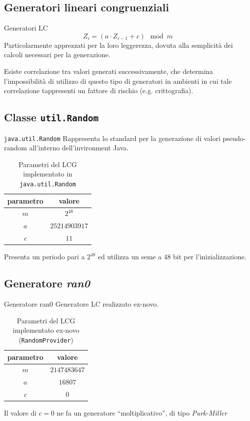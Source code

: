 \documentclass[slidestop,compress,mathserif]{beamer}
\begin{document}
\subsection{Generatori lineari congruenziali}

\begin{frame}{Generatori LC}
\vfill
$$
Z_{i}=(a \cdot Z_{i-1}+c)\mod m
$$
\vfill
Particolarmente apprezzati per la loro leggerezza, dovuta alla semplicit\`a dei calcoli necessari per la generazione. 

Esiste correlazione tra valori generati successivamente, che determina l'impossibilit\`a di utilizzo di questo tipo di generatori in ambienti in cui tale correlazione tappresenti un fattore di rischio (e.g. crittografia).
\vfill
\end{frame}

\subsection{Classe {\tt util.Random}}

\begin{frame}{\tt java.util.Random}
Rappresenta lo standard per la generazione di valori pseudo-random all'interno dell'invironment Java.
\begin{table}[!h]
	\begin{center}
	\begin{tabular}{c|c}
	parametro & valore\\
	\hline
	$m$ & $2^{48}$  \\
	$a$ & $25214903917$  \\
	$c$ & $11$  \\
	\end{tabular}
	\end{center}
	\caption{Parametri del LCG implementato in {\tt java.util.Random}}
	\label{tab:rndjava}
\end{table}
Presenta un periodo pari a $2^{48}$ ed utilizza un seme a $48$ bit per l'inizializzazione.
\end{frame}

\subsection{Generatore {\it ran0}}
\begin{frame}{Generatore ran0}
Generatore LC realizzato ex-novo.
\begin{table}[!h]
	\begin{center}
	\begin{tabular}{c|c}
	parametro & valore\\
	\hline
	$m$ & $2147483647$  \\
	$a$ & $16807$  \\
	$c$ & $0$  \\
	\end{tabular}
	\end{center}
	\caption{Parametri del LCG implementato ex-novo ({\tt RandomProvider})}
	\label{tab:rndcustom}
\end{table}
Il valore di $c=0$ ne fa un generatore ``moltiplicativo'', di tipo {\em Park-Miller}
\end{frame}
\end{document}
